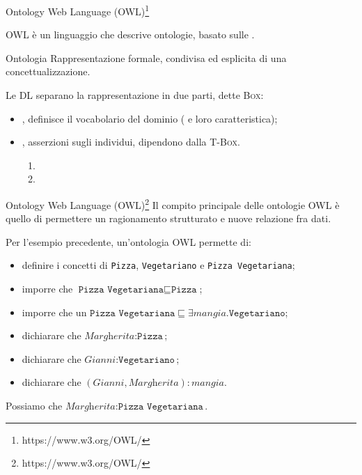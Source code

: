 \begin{frame}{Ontology Web Language (OWL)\footnote{https://www.w3.org/OWL/}}

	OWL è un linguaggio  che descrive ontologie, basato sulle .
		\begin{block}{Ontologia}
		Rappresentazione formale, condivisa ed esplicita di una concettualizzazione.
	\end{block}
	Le DL separano la rappresentazione in due parti, dette \textsc{Box}:
	\begin{itemize}
		\item \textsc{}, definisce il vocabolario del dominio ( e loro caratteristica);\\
		\item \textsc{}, asserzioni sugli individui, dipendono dalla \textsc{T-Box}.\\
			\begin{enumerate}
				\item {}
				\item {}
			\end{enumerate}
	\end{itemize}
\end{frame}

\begin{frame}{Ontology Web Language (OWL)\footnote[2]{https://www.w3.org/OWL/}}
	Il compito principale delle ontologie OWL è quello di permettere un ragionamento strutturato e  nuove relazione fra dati.
	
	\begin{example}
		Per l'esempio precedente, un'ontologia OWL permette di:
		\begin{itemize}
			\item definire i concetti di \texttt{Pizza}, \texttt{Vegetariano} e \texttt{Pizza Vegetariana};
			\item imporre che $\texttt{Pizza Vegetariana} \sqsubseteq \texttt{Pizza}$;
			\item imporre che un $\texttt{Pizza Vegetariana} \sqsubseteq \exists \textit{mangia}.\texttt{Vegetariano}$;
			\item dichiarare che $\textit{Margherita} : \texttt{Pizza}$;
			\item dichiarare che $\textit{Gianni} : \texttt{Vegetariano}$;
			\item dichiarare che $(\textit{Gianni}, \textit{Margherita}) : \textit{mangia}$.
		\end{itemize}
	\end{example}
	Possiamo  che $\textit{Margherita} : \texttt{Pizza Vegetariana}$.
\end{frame}

